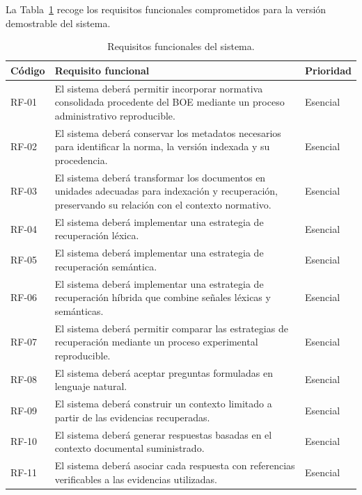 La Tabla~\ref{tab:requisitos-funcionales} recoge los requisitos funcionales comprometidos para la versión demostrable del sistema.

\begin{table}[htbp]
    \centering
    \small
    \renewcommand{\arraystretch}{1.2}
    \caption{Requisitos funcionales del sistema.}
    \label{tab:requisitos-funcionales}
    \begin{tabularx}{\textwidth}{|p{1.4cm}|X|p{2.0cm}|}
        \hline
        \textbf{Código} & \textbf{Requisito funcional} & \textbf{Prioridad} \\
        \hline
        RF-01 & El sistema deberá permitir incorporar normativa consolidada procedente del BOE mediante un proceso administrativo reproducible. & Esencial \\
        \hline
        RF-02 & El sistema deberá conservar los metadatos necesarios para identificar la norma, la versión indexada y su procedencia. & Esencial \\
        \hline
        RF-03 & El sistema deberá transformar los documentos en unidades adecuadas para indexación y recuperación, preservando su relación con el contexto normativo. & Esencial \\
        \hline
        RF-04 & El sistema deberá implementar una estrategia de recuperación léxica. & Esencial \\
        \hline
        RF-05 & El sistema deberá implementar una estrategia de recuperación semántica. & Esencial \\
        \hline
        RF-06 & El sistema deberá implementar una estrategia de recuperación híbrida que combine señales léxicas y semánticas. & Esencial \\
        \hline
        RF-07 & El sistema deberá permitir comparar las estrategias de recuperación mediante un proceso experimental reproducible. & Esencial \\
        \hline
        RF-08 & El sistema deberá aceptar preguntas formuladas en lenguaje natural. & Esencial \\
        \hline
        RF-09 & El sistema deberá construir un contexto limitado a partir de las evidencias recuperadas. & Esencial \\
        \hline
        RF-10 & El sistema deberá generar respuestas basadas en el contexto documental suministrado. & Esencial \\
        \hline
        RF-11 & El sistema deberá asociar cada respuesta con referencias verificables a las evidencias utilizadas. & Esencial \\

\end{tabularx}
\end{table}
